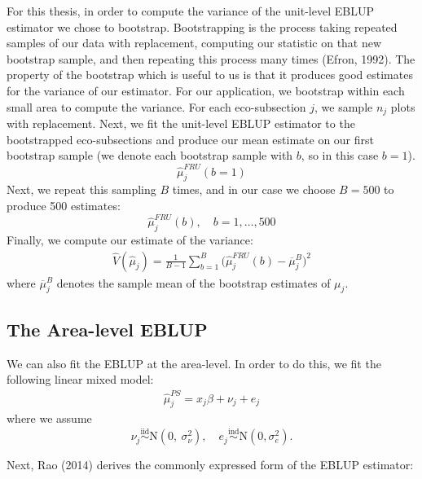 \documentclass[12pt,twoside]{reedthesis}
\begin{document}
For this thesis, in order to compute the variance of the unit-level EBLUP estimator we chose to bootstrap. Bootstrapping is the process taking repeated samples of our data with replacement, computing our statistic on that new bootstrap sample, and then repeating this process many times (Efron, 1992). The property of the bootstrap which is useful to us is that it produces good estimates for the variance of our estimator. For our application, we bootstrap within each small area to compute the variance. For each eco-subsection \(j\), we sample \(n_j\) plots with replacement. Next, we fit the unit-level EBLUP estimator to the bootstrapped eco-subsections and produce our mean estimate on our first bootstrap sample (we denote each bootstrap sample with \(b\), so in this case \(b=1\)).
\[
\hat\mu_j^{FRU}(b=1)
\]
Next, we repeat this sampling \(B\) times, and in our case we choose \(B = 500\) to produce 500 estimates:
\[
\hat\mu_j^{FRU}(b), \quad b = 1,\dots,500
\]
Finally, we compute our estimate of the variance:
\begin{align}
\hat V(\hat\mu_j) = \frac{1}{B-1} \sum_{b=1}^{B}\Big(\hat\mu^{FRU}_j(b) - \overline\mu_j^B\Big)^2
\end{align}
where \(\overline\mu_j^B\) denotes the sample mean of the bootstrap estimates of \(\mu_j\).

\hypertarget{the-area-level-eblup}{%
\subsection{The Area-level EBLUP}\label{the-area-level-eblup}}

We can also fit the EBLUP at the area-level. In order to do this, we fit the following linear mixed model:
\begin{align}
\hat\mu_{j}^{PS} = x_j \beta + \nu_j + e_j \label{eq:area-mod}
\end{align}
where we assume
\[
 \newcommand\myeq{\stackrel{\mathclap{\normalfont\mbox{s}}}{~}}
\nu_j \stackrel{\text{iid}}{\sim} \text{N}(0,~ \sigma^2_{\nu}), \quad e_{j} \stackrel{\text{ind}}{\sim}\text{N}(0, \sigma^2_e).
\]

Next, Rao (2014) derives the commonly expressed form of the EBLUP estimator:
\end{document}
